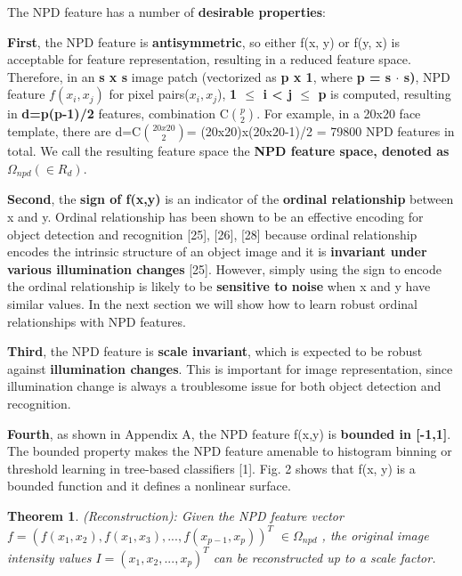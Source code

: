 \documentclass[a4paper,12pt]{article}
\newtheorem{theorem}{Theorem}
\begin{document}
The NPD feature has a number of \textbf{desirable properties}:
\begin{compactitem}
\item \textbf{First}, the NPD feature is \textbf{antisymmetric}, so either f(x, y) or f(y, x) is acceptable for feature representation, resulting in a reduced feature space. 
Therefore, in an \textbf{s x s} image patch (vectorized as \textbf{p x 1}, where \textbf{p = s $\cdot$ s)}, 
NPD feature \textbf{$f(x_i, x_j)$} for pixel pairs($x_i,x_j$),\textbf{ 1 $\le$ i < j $\le$ p} is computed, 
resulting in \textbf{d=p(p-1)/2} features, combination C$\binom{p}{2}$. 
For example, in a 20x20 face template, there are d=C$\binom{20x20}{2}$= (20x20)x(20x20-1)/2 = 79800 NPD features
in total. We call the resulting feature space the \textbf{NPD feature space, denoted as $\Omega_{npd}  (\in R_d)$}.\\

\item \textbf{Second}, the \textbf{sign of f(x,y)} is an indicator of the \textbf{ordinal relationship} between x and y. 
Ordinal relationship has been shown to be an effective encoding for object detection and recognition [25], [26], [28] 
because ordinal relationship encodes the intrinsic structure of an object image and it is \textbf{invariant under various illumination changes} [25].
However, simply using the sign to encode the ordinal relationship is likely to be \textbf{sensitive to noise} when x and y have similar values. 
In the next section we will show how to learn robust ordinal relationships with NPD features.\\

\item \textbf{Third}, the NPD feature is \textbf{scale invariant}, which is expected to be robust against
\textbf{illumination changes}. This is important for image representation, since illumination change is always a troublesome issue for
both object detection and recognition.\\

\item \textbf{Fourth}, as shown in Appendix A, the NPD feature f(x,y) is \textbf{bounded in [-1,1]}. 
The bounded property makes the NPD feature amenable to histogram binning or threshold learning in tree-based classifiers [1]. 
Fig. 2 shows that f(x, y) is a bounded function and it defines a nonlinear surface.

\begin{theorem}
\label{Reconstruction}
(Reconstruction): Given the NPD feature vector 
\\$f = (f(x_1, x_2), f(x_1, x_3), . . . ,f(x_{p-1}, x_p))^T$ $\in \Omega_{npd}$ , the original image intensity values $I = (x_1, x_2, . . . , x_p)^T$ can be reconstructed up to a scale factor.
\end{theorem}


\end{compactitem}
\end{document}
